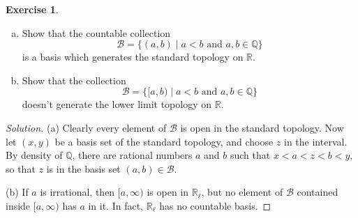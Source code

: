 \documentclass{article}
\theoremstyle{definition}
\newtheorem{exercise}{Exercise}[section]
\begin{document}
\begin{exercise}
  \begin{enumerate}[(a)]
    \item Show that the countable collection
    $$\mathcal{B} = \{(a,b)\mid a < b\text{ and }a,b\in\mathbb{Q}\}$$
    is a basis which generates the standard topology on $\mathbb{R}$.
    \item Show that the collection
    $$\mathcal{B} = \{[a,b)\mid a < b\text{ and }a,b\in\mathbb{Q}\}$$
    doesn't generate the lower limit topology on $\mathbb{R}$.
  \end{enumerate}
\end{exercise}
\begin{proof}[Solution]
  (a) Clearly every element of $\mathcal{B}$ is open in the standard topology. Now let $(x,y)$ be a basis set of the standard topology, and choose $z$ in the interval. By density of $\mathbb{Q}$, there are rational numbers $a$ and $b$ such that $x < a < z < b < y$, so that $z$ is in the basis set $(a,b)\in\mathcal{B}$.

  (b) If $a$ is irrational, then $[a, \infty)$ is open in $\mathbb{R}_\ell$, but no element of $\mathcal{B}$ contained inside $[a,\infty)$ has $a$ in it. In fact, $\mathbb{R}_\ell$ has no countable basis.
\end{proof}
\end{document}
